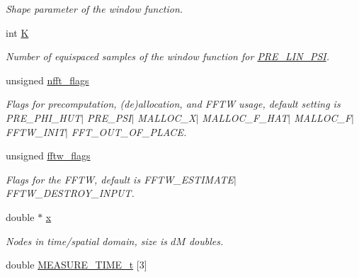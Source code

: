 \begin{CompactItemize}
\begin{CompactList}\small\item\em Shape parameter of the window function. \item\end{CompactList}\item 
\hypertarget{structnfft__plan_o11}{
int \hyperlink{structnfft__plan_o11}{K}}
\label{structnfft__plan_o11}

\begin{CompactList}\small\item\em Number of equispaced samples of the window function for \hyperlink{group__nfft_ga18}{PRE\_\-LIN\_\-PSI}. \item\end{CompactList}\item 
\hypertarget{structnfft__plan_o12}{
unsigned \hyperlink{structnfft__plan_o12}{nfft\_\-flags}}
\label{structnfft__plan_o12}

\begin{CompactList}\small\item\em Flags for precomputation, (de)allocation, and FFTW usage, default setting is PRE\_\-PHI\_\-HUT$|$ PRE\_\-PSI$|$ MALLOC\_\-X$|$ MALLOC\_\-F\_\-HAT$|$ MALLOC\_\-F$|$ FFTW\_\-INIT$|$ FFT\_\-OUT\_\-OF\_\-PLACE. \item\end{CompactList}\item 
\hypertarget{structnfft__plan_o13}{
unsigned \hyperlink{structnfft__plan_o13}{fftw\_\-flags}}
\label{structnfft__plan_o13}

\begin{CompactList}\small\item\em Flags for the FFTW, default is FFTW\_\-ESTIMATE$|$ FFTW\_\-DESTROY\_\-INPUT. \item\end{CompactList}\item 
\hypertarget{structnfft__plan_o14}{
double $\ast$ \hyperlink{structnfft__plan_o14}{x}}
\label{structnfft__plan_o14}

\begin{CompactList}\small\item\em Nodes in time/spatial domain, size is $dM$ doubles. \item\end{CompactList}\item 
\hypertarget{structnfft__plan_o15}{
double \hyperlink{structnfft__plan_o15}{MEASURE\_\-TIME\_\-t} \mbox{[}3\mbox{]}}
\label{structnfft__plan_o15}


\end{CompactItemize}
